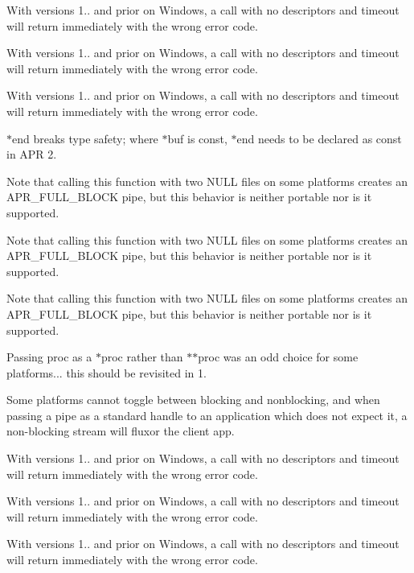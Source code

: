 \begin{DoxyRefList}
With versions 1.. and prior on Windows, a call with no descriptors and timeout will return immediately with the wrong error code. 

With versions 1.. and prior on Windows, a call with no descriptors and timeout will return immediately with the wrong error code. 

With versions 1.. and prior on Windows, a call with no descriptors and timeout will return immediately with the wrong error code. 

$\ast$end breaks type safety; where $\ast$buf is const, $\ast$end needs to be declared as const in A\+PR 2. 

Note that calling this function with two N\+U\+LL files on some platforms creates an A\+P\+R\+\_\+\+F\+U\+L\+L\+\_\+\+B\+L\+O\+CK pipe, but this behavior is neither portable nor is it supported.

Note that calling this function with two N\+U\+LL files on some platforms creates an A\+P\+R\+\_\+\+F\+U\+L\+L\+\_\+\+B\+L\+O\+CK pipe, but this behavior is neither portable nor is it supported.

Note that calling this function with two N\+U\+LL files on some platforms creates an A\+P\+R\+\_\+\+F\+U\+L\+L\+\_\+\+B\+L\+O\+CK pipe, but this behavior is neither portable nor is it supported.

Passing proc as a $\ast$proc rather than $\ast$$\ast$proc was an odd choice for some platforms... this should be revisited in 1.  
\item[\label{bug__bug000002}%
\Hypertarget{bug__bug000002}%
Member \mbox{\hyperlink{group__apr__time_ga57bfe39a9516843a151a65cd02f84616}{A\+P\+R\+\_\+\+D\+E\+C\+L\+A\+RE}} (apr\+\_\+status\+\_\+t) apr\+\_\+time\+\_\+ansi\+\_\+put(apr\+\_\+time\+\_\+t $\ast$result]Some platforms cannot toggle between blocking and nonblocking, and when passing a pipe as a standard handle to an application which does not expect it, a non-\/blocking stream will fluxor the client app. 

With versions 1.. and prior on Windows, a call with no descriptors and timeout will return immediately with the wrong error code. 

With versions 1.. and prior on Windows, a call with no descriptors and timeout will return immediately with the wrong error code. 

With versions 1.. and prior on Windows, a call with no descriptors and timeout will return immediately with the wrong error code. 


\end{DoxyRefList}
